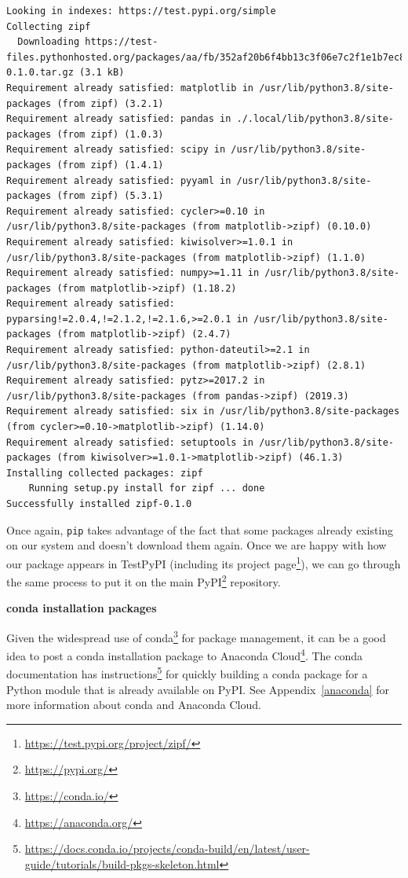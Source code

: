 \documentclass[
]{krantz}
\renewenvironment{quote}{\begin{VF}}{\end{VF}}
\renewcommand{\href}[2]{#2\footnote{\url{#1}}}
\begin{document}
\begin{verbatim}
Looking in indexes: https://test.pypi.org/simple
Collecting zipf
  Downloading https://test-files.pythonhosted.org/packages/aa/fb/352af20b6f4bb13c3f06e7c2f1e1b7ec8a11e771533d5ad05407d48059a9/zipf-0.1.0.tar.gz (3.1 kB)
Requirement already satisfied: matplotlib in /usr/lib/python3.8/site-packages (from zipf) (3.2.1)
Requirement already satisfied: pandas in ./.local/lib/python3.8/site-packages (from zipf) (1.0.3)
Requirement already satisfied: scipy in /usr/lib/python3.8/site-packages (from zipf) (1.4.1)
Requirement already satisfied: pyyaml in /usr/lib/python3.8/site-packages (from zipf) (5.3.1)
Requirement already satisfied: cycler>=0.10 in /usr/lib/python3.8/site-packages (from matplotlib->zipf) (0.10.0)
Requirement already satisfied: kiwisolver>=1.0.1 in /usr/lib/python3.8/site-packages (from matplotlib->zipf) (1.1.0)
Requirement already satisfied: numpy>=1.11 in /usr/lib/python3.8/site-packages (from matplotlib->zipf) (1.18.2)
Requirement already satisfied: pyparsing!=2.0.4,!=2.1.2,!=2.1.6,>=2.0.1 in /usr/lib/python3.8/site-packages (from matplotlib->zipf) (2.4.7)
Requirement already satisfied: python-dateutil>=2.1 in /usr/lib/python3.8/site-packages (from matplotlib->zipf) (2.8.1)
Requirement already satisfied: pytz>=2017.2 in /usr/lib/python3.8/site-packages (from pandas->zipf) (2019.3)
Requirement already satisfied: six in /usr/lib/python3.8/site-packages (from cycler>=0.10->matplotlib->zipf) (1.14.0)
Requirement already satisfied: setuptools in /usr/lib/python3.8/site-packages (from kiwisolver>=1.0.1->matplotlib->zipf) (46.1.3)
Installing collected packages: zipf
    Running setup.py install for zipf ... done
Successfully installed zipf-0.1.0
\end{verbatim}

Once again,
\texttt{pip} takes advantage of the fact that some packages already existing on our system
and doesn't download them again.
Once we are happy with how our package appears in TestPyPI
(including its \href{https://test.pypi.org/project/zipf/}{project page}),
we can go through the same process to put it on the main \href{https://pypi.org/}{PyPI} repository.

\begin{quote}
\textbf{conda installation packages}

Given the widespread use of \href{https://conda.io/}{conda} for package management,
it can be a good idea to post a conda installation package to
\href{https://anaconda.org/}{Anaconda Cloud}.
The conda documentation has \href{https://docs.conda.io/projects/conda-build/en/latest/user-guide/tutorials/build-pkgs-skeleton.html}{instructions} for quickly building
a conda package for a Python module that is already available on PyPI.
See Appendix~\ref{anaconda} for more information about conda and Anaconda Cloud.
\end{quote}
\end{document}
